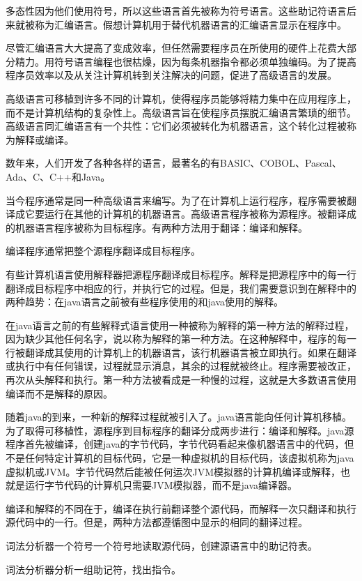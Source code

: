 多态性因为他们使用符号，所以这些语言首先被称为符号语言。这些助记符语言后来就被称为汇编语言。假想计算机用于替代机器语言的汇编语言显示在程序中。

尽管汇编语言大大提高了变成效率，但任然需要程序员在所使用的硬件上花费大部分精力。用符号语言编程也很枯燥，因为每条机器指令都必须单独编码。为了提高程序员效率以及从关注计算机转到关注解决的问题，促进了高级语言的发展。

高级语言可移植到许多不同的计算机，使得程序员能够将精力集中在应用程序上，而不是计算机结构的复杂性上。高级语言旨在使程序员摆脱汇编语言繁琐的细节。高级语言同汇编语言有一个共性：它们必须被转化为机器语言，这个转化过程被称为解释或编译。

数年来，人们开发了各种各样的语言，最著名的有BASIC、COBOL、Pascal、Ada、C、C++和Java。

当今程序通常是同一种高级语言来编写。为了在计算机上运行程序，程序需要被翻译成它要运行在其他的计算机的机器语言。高级语言程序被称为源程序。被翻译成的机器语言程序被称为目标程序。有两种方法用于翻译：编译和解释。

编译程序通常把整个源程序翻译成目标程序。

有些计算机语言使用解释器把源程序翻译成目标程序。解释是把源程序中的每一行翻译成目标程序中相应的行，并执行它的过程。但是，我们需要意识到在解释中的两种趋势：在java语言之前被有些程序使用的和java使用的解释。

在java语言之前的有些解释式语言使用一种被称为解释的第一种方法的解释过程，因为缺少其他任何名字，说以称为解释的第一种方法。在这种解释中，程序的每一行被翻译成其使用的计算机上的机器语言，该行机器语言被立即执行。如果在翻译或执行中有任何错误，过程就显示消息，其余的过程就被终止。程序需要被改正，再次从头解释和执行。第一种方法被看成是一种慢的过程，这就是大多数语言使用编译而不是解释的原因。

随着java的到来，一种新的解释过程就被引入了。java语言能向任何计算机移植。为了取得可移植性，源程序到目标程序的翻译分成两步进行：编译和解释。java源程序首先被编译，创建java的字节代码，字节代码看起来像机器语言中的代码，但不是任何特定计算机的目标代码，它是一种虚拟机的目标代码，该虚拟机称为java虚拟机或JVM。字节代码然后能被任何运次JVM模拟器的计算机编译或解释，也就是运行字节代码的计算机只需要JVM模拟器，而不是java编译器。

编译和解释的不同在于，编译在执行前翻译整个源代码，而解释一次只翻译和执行源代码中的一行。但是，两种方法都遵循图中显示的相同的翻译过程。

词法分析器一个符号一个符号地读取源代码，创建源语言中的助记符表。

词法分析器分析一组助记符，找出指令。

